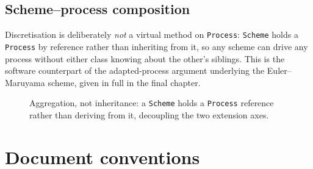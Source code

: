 \documentclass[11pt]{report}
\theoremstyle{plain}
\theoremstyle{definition}
\theoremstyle{remark}
\numberwithin{equation}{chapter}
\begin{document}
\subsection*{Scheme--process composition}

Discretisation is deliberately \emph{not} a virtual method on
\texttt{Process}: \texttt{Scheme} holds a \texttt{Process} by
reference rather than inheriting from it, so any scheme can drive any
process without either class knowing about the other's siblings. This
is the software counterpart of the adapted-process argument underlying
the Euler--Maruyama scheme, given in full in the final chapter.

\begin{figure}[h]
\centering
{}
\caption{Aggregation, not inheritance: a \texttt{Scheme} holds a
\texttt{Process} reference rather than deriving from it, decoupling
the two extension axes.}
\label{fig:scheme-composition}
\end{figure}

\section*{Document conventions}
\end{document}
